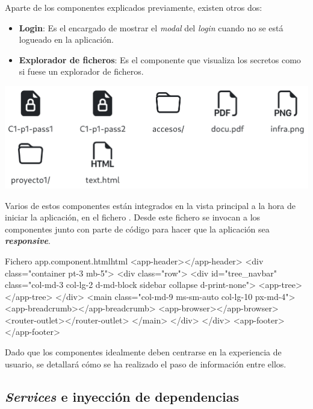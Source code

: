 \documentclass{\ClassPath/viu-tfm-template}
\begin{document}
Aparte de los componentes explicados previamente, existen otros dos:

\begin{itemize}
    \item \textbf{Login}: Es el encargado de mostrar el \textit{modal} del \textit{login} cuando no se está logueado en la aplicación.
    \item \textbf{Explorador de ficheros}: Es el componente que visualiza los secretos como si fuese un explorador de ficheros.
\end{itemize}

\begin{center}
    \includegraphics[width=0.9\linewidth]{img/browser.png}
\end{center}


Varios de estos componentes están integrados en la vista principal a la hora de iniciar la aplicación, en el fichero . Desde este fichero se invocan a los componentes junto con parte de código para hacer que la aplicación sea \textit{\textbf{responsive}}.

\begin{mycode}{Fichero app.component.html}{html}{}
<app-header></app-header>
<div class="container pt-3 mb-5">
    <div class="row">
        <div id="tree_navbar" class="col-md-3 col-lg-2 d-md-block sidebar
         collapse d-print-none">
            <app-tree></app-tree>
        </div>
        <main class="col-md-9 ms-sm-auto col-lg-10 px-md-4">
            <app-breadcrumb></app-breadcrumb>
            <app-browser></app-browser>
            <router-outlet></router-outlet>
        </main>
    </div>
</div>
<app-footer></app-footer>
\end{mycode}


Dado que los componentes idealmente deben centrarse en la experiencia de usuario, se detallará cómo se ha realizado el paso de información entre ellos.



\subsection{\textit{Services} e inyección de dependencias}
\end{document}
